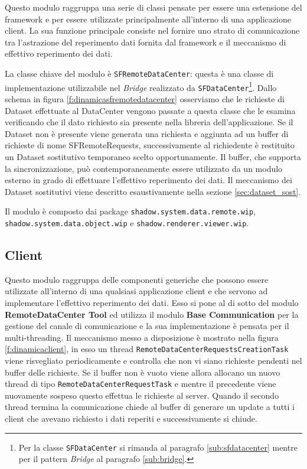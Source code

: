 Questo modulo raggruppa una serie di classi pensate per essere una estensione del framework e per essere utilizzate principalmente all'interno di una applicazione client.
La sua funzione principale consiste nel fornire uno strato di comunicazione tra l'astrazione del reperimento dati fornita dal framework e il meccanismo di effettivo reperimento dei dati.

La classe chiave del modulo \`e \texttt{SFRemoteDataCenter}: questa \`e una classe di implementazione utilizzabile nel \textit{Bridge} realizzato da \texttt{SFDataCenter}\footnote{Per la classe \texttt{SFDataCenter} si rimanda al paragrafo \ref{sub:sfdatacenter} mentre per il pattern \textit{Bridge} al paragrafo \ref{sub:bridge}.}.
Dallo schema in figura \ref{f:dinamicasfremotedatacenter} osserviamo che le richieste di Dataset effettuate al DataCenter vengono passate a questa classe che le esamina verificando che il dato richiesto sia presente nella libreria dell'applicazione. Se il Dataset non \`e presente viene generata una richiesta e aggiunta ad un buffer di richieste di nome SFRemoteRequests, successivamente al richiedente \`e restituito un Dataset sostitutivo temporaneo scelto opportunamente. Il buffer, che supporta la sincronizzazione, pu\`o contemporaneamente essere utilizzato da un modulo esterno in grado di effettuare l'effettivo reperimento dei dati.
Il meccanismo dei Dataset sostitutivi viene descritto esaustivamente nella sezione \ref{sec:dataset_sost}.

Il modulo \`e composto dai package \texttt{shadow.system.data.remote.wip}, \texttt{shadow.system.data.object.wip} e \texttt{shadow.renderer.viewer.wip}.

\subsection{Client}
\label{sub:clientmodule}
Questo modulo raggruppa delle componenti generiche che possono essere utilizzate all'interno di una qualsiasi applicazione client e che servono ad implementare l'effettivo reperimento dei dati. 
Esso si pone al di sotto del modulo \textbf{RemoteDataCenter Tool} ed utilizza il modulo \textbf{Base Communication} per la gestione del canale di comunicazione e la sua implementazione \`e pensata per il multi-threading.
Il meccanismo messo a disposizione \`e mostrato nella figura \ref{f:dinamicaclient}, in esso un thread \texttt{RemoteDataCenterRequestsCreationTask} viene risvegliato periodicamente e controlla che non vi siano richieste pendenti nel buffer delle richieste. Se il buffer non \`e vuoto viene allora allocano un nuovo thread di tipo \texttt{RemoteDataCenterRequestTask} e mentre il precedente viene nuovamente sospeso questo effettua le richieste al server. Quando il secondo thread termina la comunicazione chiede al buffer di generare un update a tutti i client che avevano richiesto i dati reperiti e successivamente si chiude.



